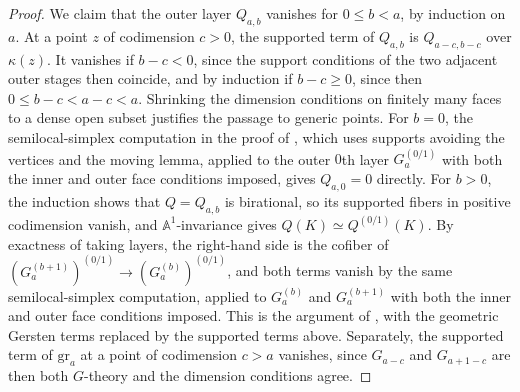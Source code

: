 \begin{proof}
We claim that the outer layer $Q_{a,b}$ vanishes for $0\le b<a$, by induction on $a$.
At a point $z$ of codimension $c>0$, the supported term of $Q_{a,b}$ is $Q_{a-c,b-c}$ over $\kappa(z)$.
It vanishes if $b-c<0$, since the support conditions of the two adjacent outer stages then coincide, and by induction if $b-c\ge0$, since then $0\le b-c<a-c<a$.
Shrinking the dimension conditions on finitely many faces to a dense open subset justifies the passage to generic points.
For $b=0$, the semilocal-simplex computation in the proof of \cite[Lemma 5.2.1]{LevineHomotopyConiveau}, which uses supports avoiding the vertices and the moving lemma, applied to the outer $0$th layer $G_a^{(0/1)}$ with both the inner and outer face conditions imposed, gives $Q_{a,0}=0$ directly.
For $b>0$, the induction shows that $Q=Q_{a,b}$ is birational, so its supported fibers in positive codimension vanish, and $\mathbb A^1$-invariance gives $Q(K)\simeq Q^{(0/1)}(K)$.
By exactness of taking layers, the right-hand side is the cofiber of $(G_a^{(b+1)})^{(0/1)}\to(G_a^{(b)})^{(0/1)}$, and both terms vanish by the same semilocal-simplex computation, applied to $G_a^{(b)}$ and $G_a^{(b+1)}$ with both the inner and outer face conditions imposed.
This is the argument of \cite[Proposition 5.2.2]{LevineHomotopyConiveau}, with the geometric Gersten terms replaced by the supported terms above.
Separately, the supported term of $\mathrm{gr}_a$ at a point of codimension $c>a$ vanishes, since $G_{a-c}$ and $G_{a+1-c}$ are then both $G$-theory and the dimension conditions agree.


\end{proof}
